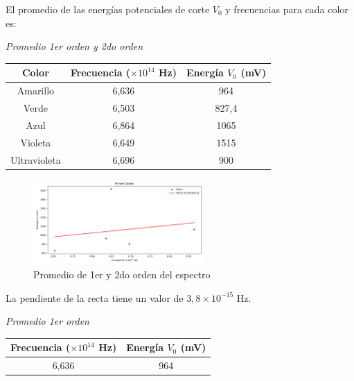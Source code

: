 \documentclass[a4paper]{article}
\begin{document}
      \indent El promedio de las energías potenciales de corte $V_{0}$ y frecuencias para cada color es:\\
      \begin{center}
        \textit{Promedio 1er orden y 2do orden}  
      \end{center}

      \begin{center}
        \begin{tabular}{ c c c }
          \toprule
          Color & Frecuencia ($\times 10^{14}$ Hz) & Energía $V_{0}$ (mV) \\
            \midrule
            Amarillo      & 6,636 & 964   \\
            Verde         & 6,503 & 827,4 \\
            Azul          & 6,864 & 1065  \\
            Violeta       & 6,649 & 1515  \\
            Ultravioleta  & 6,696 & 900   \\
          \bottomrule
        \end{tabular}
      \end{center}
      \vspace{5mm}

      \begin{figure}[h]
        \centering
        \includegraphics[width=6.5cm]{../imagenes/promedio1ery2do_orden.png}
        \caption{\small Promedio de 1er y 2do orden del espectro}
      \end{figure}
      \vspace{5mm}

      \indent La pendiente de la recta tiene un valor de $3,8 \times 10^{-15}$ Hz.
      \vspace{5mm}

      \begin{minipage}[c]{7.5cm}
        \vspace{5mm}
        \centering
        \textit{Promedio 1er orden} 
        \vspace{2mm}
      \end{minipage}

      \begin{center}
        \begin{tabular}{ c c }
          \toprule
           Frecuencia ($\times 10^{14}$ Hz) & Energía $V_{0}$ (mV) \\
            \midrule
             6,636 & 964 \\
          \bottomrule
        \end{tabular}
      \end{center}
\end{document}
